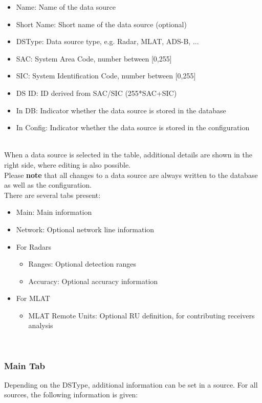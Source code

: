 \begin{itemize}
\item Name: Name of the data source
\item Short Name: Short name of the data source (optional)
\item DSType: Data source type, e.g. Radar, MLAT, ADS-B, ...
\item SAC: System Area Code, number between [0,255]
\item SIC: System Identification Code, number between [0,255]
\item DS ID: ID derived from SAC/SIC (255*SAC+SIC)
\item In DB: Indicator whether the data source is stored in the database
\item In Config: Indicator whether the data source is stored in the configuration
\end{itemize}
\ \\

When a data source is selected in the table, additional details are shown in the right side, where editing is also possible. \\

Please \textbf{note} that all changes to a data source are always written to the database as well as the configuration. \\

There are several tabs present:
\begin{itemize}
\item Main: Main information
\item Network: Optional network line information
\item For Radars
\begin{itemize}
\item Ranges: Optional detection ranges
\item Accuracy: Optional accuracy information
\end{itemize}
\item For MLAT
\begin{itemize}
\item MLAT Remote Units: Optional RU definition, for contributing receivers analysis
\end{itemize}
\end{itemize}
\ \\

\subsubsection {Main Tab}
Depending on the DSType, additional information can be set in a source. For all sources, the following information is given:

